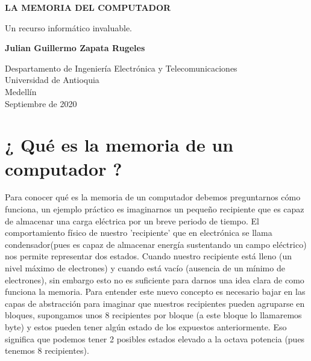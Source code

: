 \documentclass{article}
\begin{document}
\begin{titlepage}
    \begin{center}
        \vspace*{1cm}
            
        \Huge
        \textbf{LA MEMORIA DEL COMPUTADOR}
            
        \vspace{0.5cm}
        \LARGE
        Un recurso informático invaluable.
        \vspace{1.5cm}
            
        \textbf{Julian Guillermo Zapata Rugeles}
            
        \vfill
            
        \vspace{0.8cm}
            
        \Large
        Despartamento de Ingeniería Electrónica y Telecomunicaciones\\
        Universidad de Antioquia\\
        Medellín\\
        Septiembre de 2020
            
    \end{center}
\end{titlepage}

\tableofcontents

\section{¿ Qué es la memoria de un computador ?}
Para conocer qué es la memoria de un computador debemos preguntarnos cómo funciona, un ejemplo práctico es imaginarnos un pequeño recipiente que es capaz de almacenar una carga eléctrica por un breve periodo de tiempo. El comportamiento físico de nuestro 'recipiente' que en electrónica se llama condensador(pues es capaz de almacenar energía sustentando un campo eléctrico) nos permite representar dos estados. Cuando nuestro recipiente está lleno (un nivel máximo de electrones) y cuando está vacío (ausencia de un mínimo de electrones), sin embargo esto no es suficiente para darnos una idea clara de como funciona la memoria.
Para entender este nuevo concepto es necesario bajar en las capas de abstracción para imaginar que nuestros recipientes pueden agruparse en bloques, supongamos unos 8 recipientes por bloque (a este bloque lo llamaremos byte) y estos pueden tener algún estado de los expuestos anteriormente. Eso significa que podemos tener 2 posibles estados elevado a la octava potencia (pues tenemos 8 recipientes).
\end{document}
